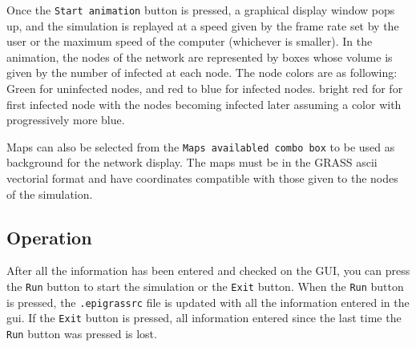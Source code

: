 Once the \texttt{Start animation} button is pressed, a graphical display window pops up, and the simulation is replayed at a speed given by the frame rate set by the user  or the maximum speed of the computer (whichever is smaller). In the animation, the nodes of the network are represented by boxes whose volume is given by the number of infected at each node. The node colors are as following: Green for uninfected nodes, and red to blue for infected nodes. bright red for for first infected node with the nodes becoming infected later assuming a color with progressively more blue.


Maps can also be selected from the \texttt{Maps availabled combo box} to be used as background for the network display. The maps must be in the GRASS ascii vectorial format and have coordinates compatible with those given to the nodes of the simulation.

\subsection{Operation}
After all the information has been entered and checked on the GUI, you can press the \texttt{Run} button to start the simulation or the \texttt{Exit} button. When the \texttt{Run} button is pressed, the \texttt{.epigrassrc} file is updated with all the information entered in the gui. If the \texttt{Exit} button is pressed, all information entered since the last time the \texttt{Run} button was pressed is lost.

